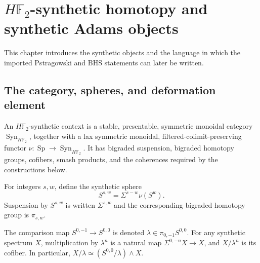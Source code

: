 \chapter{$H\mathbb F_2$-synthetic homotopy and synthetic Adams objects}
\label{chap:synthetic-foundations}

This chapter introduces the synthetic objects and the language in which the imported Pstragowski and BHS statements can later be written.

\section{The category, spheres, and deformation element}

\begin{definition}
  \label{def:synthetic-context}
  \notready
  An $H\mathbb F_2$-synthetic context is a stable, presentable, symmetric
  monoidal category $\operatorname{Syn}_{H\mathbb F_2}$, together with a lax
  symmetric monoidal, filtered-colimit-preserving functor
  $\nu:\operatorname{Sp}\to\operatorname{Syn}_{H\mathbb F_2}$.  It has
  bigraded suspension, bigraded homotopy groups, cofibers, smash products, and
  the coherences required by the constructions below.
\end{definition}

\begin{definition}
  \label{def:synthetic-sphere}
  \notready
  For integers $s,w$, define the synthetic sphere
  \[
    S^{s,w}=\Sigma^{s-w}\nu(S^w).
  \]
  Suspension by $S^{s,w}$ is written $\Sigma^{s,w}$ and the corresponding
  bigraded homotopy group is $\pi_{s,w}$.
\end{definition}

\begin{definition}
  \label{def:synthetic-lambda-quotient}
  \notready
  The comparison map $S^{0,-1}\to S^{0,0}$ is denoted
  $\lambda\in\pi_{0,-1}S^{0,0}$.  For any synthetic spectrum $X$, multiplication
  by $\lambda^n$ is a natural map
  $\Sigma^{0,-n}X\to X$, and $X/\lambda^n$ is its cofiber.  In particular,
  $X/\lambda\simeq(S^{0,0}/\lambda)\mathbin{\wedge}X$.
\end{definition}

